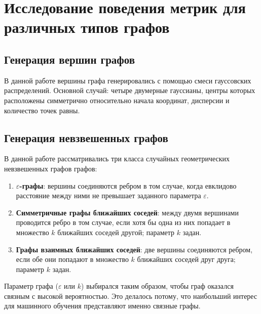 \chapter{Исследование поведения метрик для различных типов графов} \label{chapt2}

\section{Генерация вершин графов} \label{sect2_1}

В данной работе вершины графа генерировались с помощью смеси гауссовских распределений. Основной случай: четыре двумерные гауссианы, центры которых расположены симметрично относительно начала координат, дисперсии и количество точек равны.




\section{Генерация невзвешенных графов} \label{sect2_2}

В данной работе рассматривались три класса случайных геометрических невзвешенных графов графов: 
\begin{enumerate}
  \item \textbf{$\varepsilon$-графы}: вершины соединяются ребром в том случае, когда евклидово расстояние между ними не превышает заданного параметра $\varepsilon$.
  \item \textbf{Симметричные графы ближайших соседей}: между двумя вершинами проводится ребро в том случае, если хотя бы одна из них попадает в множество $k$ ближайших соседей другой; параметр $k$ задан.
  \item \textbf{Графы взаимных ближайших соседей}: две вершины соединяются ребром, если обе они попадают в множество $k$ ближайших соседей друг друга; параметр $k$ задан.
\end{enumerate}

Параметр графа ($\varepsilon$ или $k$) выбирался таким образом, чтобы граф оказался связным с высокой вероятностью. Это делалось потому, что наибольший интерес для машинного обучения представляют именно связные графы.

